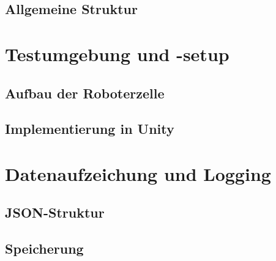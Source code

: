 \subsection{Allgemeine Struktur}







\section{Testumgebung und -setup}
\subsection{Aufbau der Roboterzelle}
\subsection{Implementierung in Unity}
\section{Datenaufzeichung und Logging}
\subsection{JSON-Struktur}
\subsection{Speicherung}